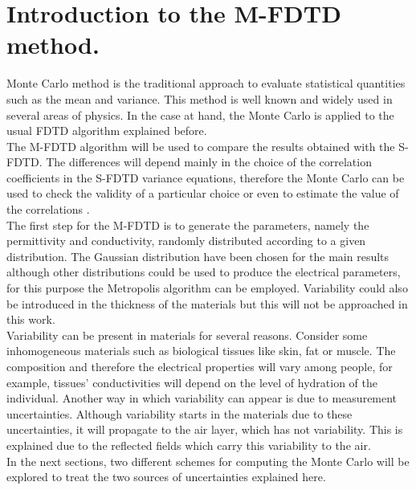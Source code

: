 \documentclass[12pt, oneside]{book}
\begin{document}
\section{Introduction to the M-FDTD method.}
\indent Monte Carlo method \cite{Hastings1995,Ajayi2008} is the traditional approach to evaluate statistical quantities such as the mean and variance. This method is well known and widely used in several areas of physics. In the case at hand, the Monte Carlo is applied to the usual FDTD algorithm explained before. \\
\indent The M-FDTD algorithm will be used to compare the results obtained with the S-FDTD. The differences will depend mainly in the choice of the correlation coefficients in the S-FDTD variance equations, therefore the Monte Carlo can be used to check the validity of a particular choice or even to estimate the value of the correlations \cite{Bisheh2015}. \\
\indent The first step for the M-FDTD is to generate the parameters, namely the permittivity and conductivity, randomly distributed according to a given distribution. The Gaussian distribution have been chosen for the main results although other distributions could be used to produce the electrical parameters, for this purpose the Metropolis algorithm can be employed. Variability could also be introduced in the thickness of the materials but this will not be approached in this work. \\
\indent Variability can be present in materials for several reasons. Consider some inhomogeneous materials such as biological tissues like skin, fat or muscle. The composition and therefore the electrical properties will vary among people, for example, tissues' conductivities will depend on the level of hydration of the individual.
Another way in which variability can appear is due to measurement uncertainties. Although variability starts in the materials due to these uncertainties, it will propagate to the air layer, which has not variability. This is explained due to the reflected fields which carry this variability to the air. \\
\indent In the next sections, two different schemes for computing the Monte Carlo will be explored to treat the two sources of uncertainties explained here. 
\end{document}
